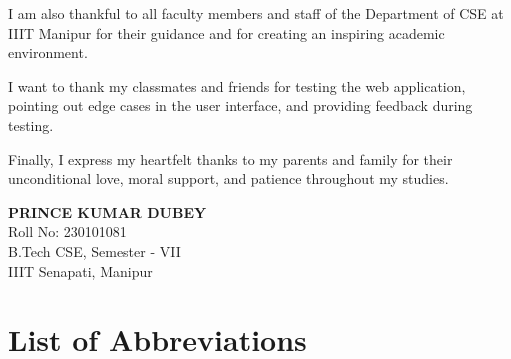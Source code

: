 \documentclass[a4paper, 12pt, oneside]{report}
\begin{document}
I am also thankful to all faculty members and staff of the Department of CSE at IIIT Manipur for their guidance and for creating an inspiring academic environment.

I want to thank my classmates and friends for testing the web application, pointing out edge cases in the user interface, and providing feedback during testing. 

Finally, I express my heartfelt thanks to my parents and family for their unconditional love, moral support, and patience throughout my studies.

\vspace{1.5cm}
\begin{flushright}
\textbf{PRINCE KUMAR DUBEY}\\
Roll No: 230101081\\
B.Tech CSE, Semester - VII\\
IIIT Senapati, Manipur
\end{flushright}

\tableofcontents
\listoffigures
\listoftables

\newpage
\chapter*{List of Abbreviations}
\end{document}
